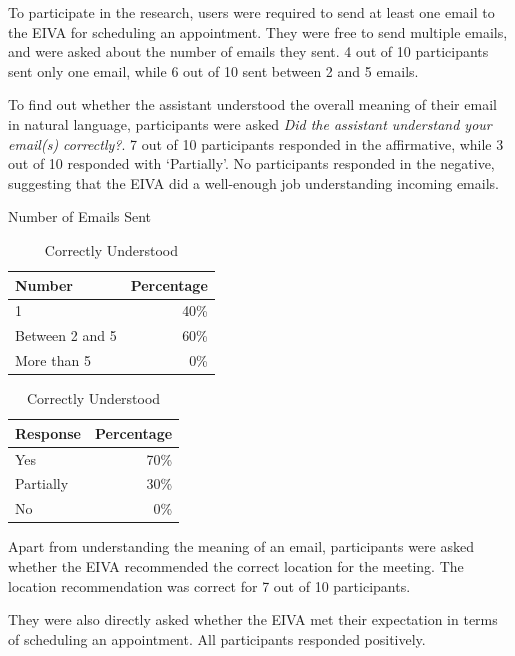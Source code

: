 \documentclass{article}
\begin{document}
To participate in the research, users were required to send at least one email to the EIVA for scheduling an appointment. They were free to send multiple emails, and were asked about the number of emails they sent. 4 out of 10 participants sent only one email, while 6 out of 10 sent between 2 and 5 emails.

To find out whether the assistant understood the overall meaning of their email in natural language, participants were asked \emph{Did the assistant understand your email(s) correctly?}. 7 out of 10 participants responded in the affirmative, while 3 out of 10 responded with `Partially'. No participants responded in the negative, suggesting that the EIVA did a well-enough job understanding incoming emails.

\begin{table}[!htb]
	\begin{minipage}{.5\linewidth}
		\caption{Number of Emails Sent}
		\centering
		\begin{tabular}{lr}
			\hline
			\textbf{Number} & \textbf{Percentage} \\
			\hline
			1               & 40\%                \\
			Between 2 and 5 & 60\%                \\
			More than 5     & 0\%                 \\
			\hline
		\end{tabular}
	\end{minipage}%
	\hspace{.1cm}
	\begin{minipage}{.5\linewidth}
		\centering
		\caption{Correctly Understood}
		\begin{tabular}{lr}
			\hline
			\textbf{Response} & \textbf{Percentage} \\
			\hline
			Yes               & 70\%                \\
			Partially         & 30\%                \\
			No                & 0\%                 \\
			\hline
		\end{tabular}
	\end{minipage} 
\end{table}

Apart from understanding the meaning of an email, participants were asked whether the EIVA recommended the correct location for the meeting. The location recommendation was correct for 7 out of 10 participants.

They were also directly asked whether the EIVA met their expectation in terms of scheduling an appointment. All participants responded positively.
\end{document}
